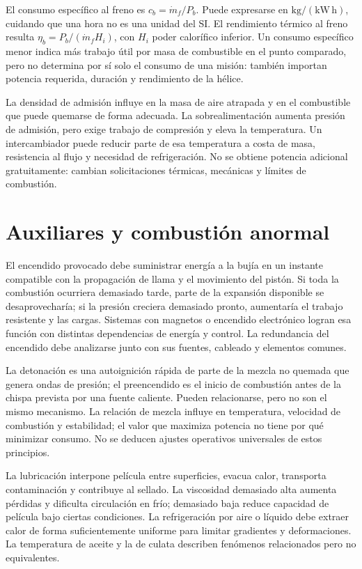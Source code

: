El consumo específico al freno es $c_b=\dot m_f/P_b$. Puede expresarse en $\mathrm{kg/(kW\,h)}$, cuidando que una hora no es una unidad del SI. El rendimiento térmico al freno resulta $\eta_b=P_b/(\dot m_f H_i)$, con $H_i$ poder calorífico inferior. Un consumo específico menor indica más trabajo útil por masa de combustible en el punto comparado, pero no determina por sí solo el consumo de una misión: también importan potencia requerida, duración y rendimiento de la hélice.

La densidad de admisión influye en la masa de aire atrapada y en el combustible que puede quemarse de forma adecuada. La sobrealimentación aumenta presión de admisión, pero exige trabajo de compresión y eleva la temperatura. Un intercambiador puede reducir parte de esa temperatura a costa de masa, resistencia al flujo y necesidad de refrigeración. No se obtiene potencia adicional gratuitamente: cambian solicitaciones térmicas, mecánicas y límites de combustión.

\section{Auxiliares y combustión anormal}
El encendido provocado debe suministrar energía a la bujía en un instante compatible con la propagación de llama y el movimiento del pistón. Si toda la combustión ocurriera demasiado tarde, parte de la expansión disponible se desaprovecharía; si la presión creciera demasiado pronto, aumentaría el trabajo resistente y las cargas. Sistemas con magnetos o encendido electrónico logran esa función con distintas dependencias de energía y control. La redundancia del encendido debe analizarse junto con sus fuentes, cableado y elementos comunes.

La detonación es una autoignición rápida de parte de la mezcla no quemada que genera ondas de presión; el preencendido es el inicio de combustión antes de la chispa prevista por una fuente caliente. Pueden relacionarse, pero no son el mismo mecanismo. La relación de mezcla influye en temperatura, velocidad de combustión y estabilidad; el valor que maximiza potencia no tiene por qué minimizar consumo. No se deducen ajustes operativos universales de estos principios.

La lubricación interpone película entre superficies, evacua calor, transporta contaminación y contribuye al sellado. La viscosidad demasiado alta aumenta pérdidas y dificulta circulación en frío; demasiado baja reduce capacidad de película bajo ciertas condiciones. La refrigeración por aire o líquido debe extraer calor de forma suficientemente uniforme para limitar gradientes y deformaciones. La temperatura de aceite y la de culata describen fenómenos relacionados pero no equivalentes.


